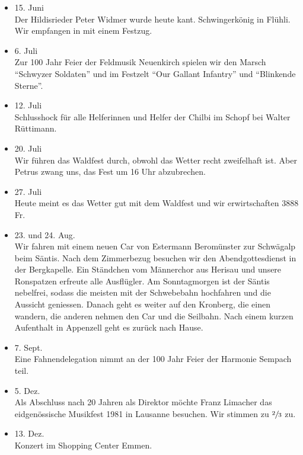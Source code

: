 \begin{multicols}{2}
\begin{itemize}
        \item[]15. Juni\\
        Der Hildisrieder Peter Widmer wurde heute kant. Schwingerkönig in
        Flühli. Wir empfangen in mit einem Festzug.

        \item[]6. Juli\\
        Zur 100 Jahr Feier der Feldmusik Neuenkirch spielen wir den Marsch
        \enquote{Schwyzer Soldaten} und im Festzelt \enquote{Our Gallant Infantry} und
        \enquote{Blinkende Sterne}.

        \item[]12. Juli\\
        Schlusshock für alle Helferinnen und Helfer der Chilbi im Schopf bei
        Walter Rüttimann.

        \item[]20. Juli\\
        Wir führen das Waldfest durch, obwohl das Wetter recht zweifelhaft ist.
        Aber Petrus zwang uns, das Fest um 16 Uhr abzubrechen.

        \item[]27. Juli\\
        Heute meint es das Wetter gut mit dem Waldfest und wir erwirtschaften
        3888 Fr.

        \item[]23. und 24. Aug.\\
        Wir fahren mit einem neuen Car von Estermann Beromünster zur Schwägalp
        beim Säntis. Nach dem Zimmerbezug besuchen wir den Abendgottesdienst in
        der Bergkapelle. Ein Ständchen vom Männerchor aus Herisau und unsere
        Ronspatzen erfreute alle Ausflügler. Am Sonntagmorgen ist der Säntis
        nebelfrei, sodass die meisten mit der Schwebebahn hochfahren und die
        Aussicht geniessen. Danach geht es weiter auf den Kronberg, die einen
        wandern, die anderen nehmen den Car und die Seilbahn. Nach einem kurzen
        Aufenthalt in Appenzell geht es zurück nach Hause.

        \item[]7. Sept.\\
        Eine Fahnendelegation nimmt an der 100 Jahr Feier der Harmonie Sempach
        teil.

        \item[]5. Dez.\\
        Als Abschluss nach 20 Jahren als Direktor möchte Franz Limacher das
        eidgenössische Musikfest 1981 in Lausanne besuchen. Wir stimmen zu
        $\sfrac{2}{3}$ zu.

        \item[]13. Dez.\\
        Konzert im Shopping Center Emmen.


    \end{itemize}

\end{multicols}
